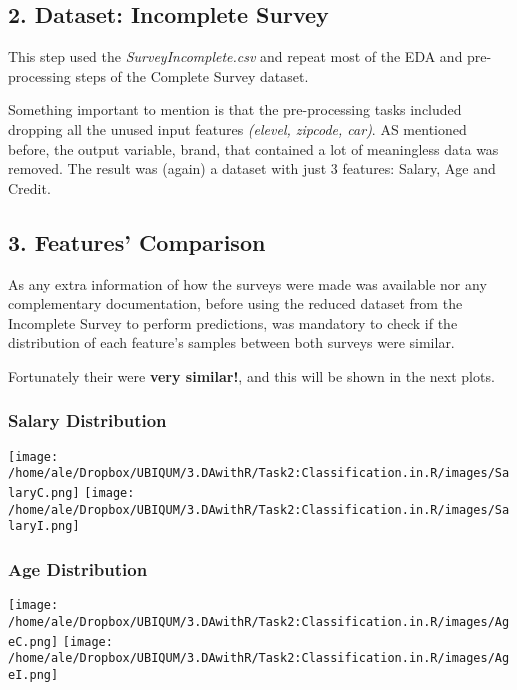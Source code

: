 \documentclass[
]{article}
\begin{document}
\hypertarget{dataset-incomplete-survey}{%
\subsection{2. Dataset: Incomplete
Survey}\label{dataset-incomplete-survey}}

This step used the \emph{SurveyIncomplete.csv} and repeat most of the
EDA and pre-processing steps of the Complete Survey dataset.

Something important to mention is that the pre-processing tasks included
dropping all the unused input features \emph{(elevel, zipcode, car)}. AS
mentioned before, the output variable, brand, that contained a lot of
meaningless data was removed. The result was (again) a dataset with just
3 features: Salary, Age and Credit.

\hypertarget{features-comparison}{%
\subsection{3. Features' Comparison}\label{features-comparison}}

As any extra information of how the surveys were made was available nor
any complementary documentation, before using the reduced dataset from
the Incomplete Survey to perform predictions, was mandatory to check if
the distribution of each feature's samples between both surveys were
similar.

Fortunately their were \textbf{very similar!}, and this will be shown in
the next plots.

\hypertarget{salary-distribution}{%
\subsubsection{Salary Distribution}\label{salary-distribution}}

\texttt{[image: /home/ale/Dropbox/UBIQUM/3.DAwithR/Task2:Classification.in.R/images/SalaryC.png]}
\texttt{[image: /home/ale/Dropbox/UBIQUM/3.DAwithR/Task2:Classification.in.R/images/SalaryI.png]}

\hypertarget{age-distribution}{%
\subsubsection{Age Distribution}\label{age-distribution}}

\texttt{[image: /home/ale/Dropbox/UBIQUM/3.DAwithR/Task2:Classification.in.R/images/AgeC.png]}
\texttt{[image: /home/ale/Dropbox/UBIQUM/3.DAwithR/Task2:Classification.in.R/images/AgeI.png]}
\end{document}
